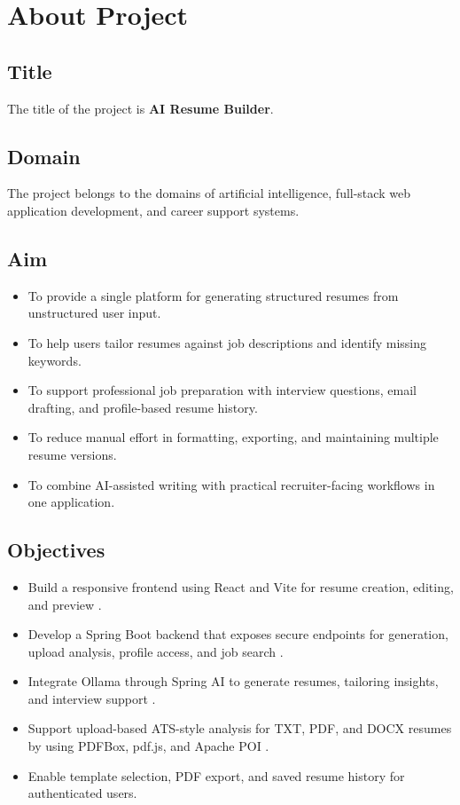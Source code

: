 \section{About Project}
\subsection{Title}
\noindent The title of the project is \textbf{AI Resume Builder}.

\subsection{Domain}
\noindent The project belongs to the domains of artificial intelligence, full-stack web application development, and career support systems.

\subsection{Aim}
\begin{itemize}
\item To provide a single platform for generating structured resumes from unstructured user input.
\item To help users tailor resumes against job descriptions and identify missing keywords.
\item To support professional job preparation with interview questions, email drafting, and profile-based resume history.
\item To reduce manual effort in formatting, exporting, and maintaining multiple resume versions.
\item To combine AI-assisted writing with practical recruiter-facing workflows in one application.
\end{itemize}

\subsection{Objectives}
\begin{itemize}
\item Build a responsive frontend using React and Vite for resume creation, editing, and preview \cite{react_docs,vite_docs}.
\item Develop a Spring Boot backend that exposes secure endpoints for generation, upload analysis, profile access, and job search \cite{spring_boot_docs,spring_security_docs}.
\item Integrate Ollama through Spring AI to generate resumes, tailoring insights, and interview support \cite{spring_ai_docs,ollama_docs}.
\item Support upload-based ATS-style analysis for TXT, PDF, and DOCX resumes by using PDFBox, pdf.js, and Apache POI \cite{pdfbox_docs,pdfjs_docs,poi_docs}.
\item Enable template selection, PDF export, and saved resume history for authenticated users.
\end{itemize}

